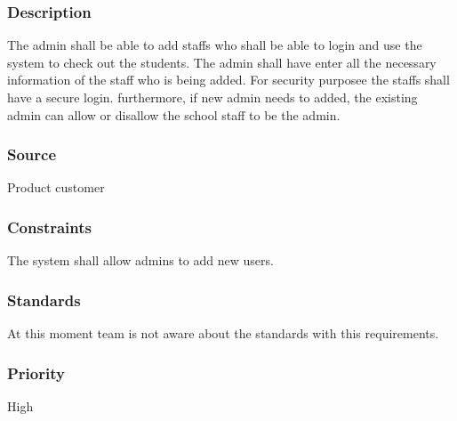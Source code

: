 \subsubsection{Description}
\quad \quad The admin shall be able to add staffs who shall be able to login and use the system to 
check out the students. The admin shall have enter all the necessary information of 
the staff who is being added. For security purposee the staffs shall have a secure 
login. furthermore, if new admin needs to added, the existing admin can allow or 
disallow the school staff to be the admin. 
\subsubsection{Source}
\quad \quad Product customer
\subsubsection{Constraints}
\quad \quad The system shall allow admins to add new users.
\subsubsection{Standards}
\quad \quad At this moment team is not aware about the standards with this requirements.
\subsubsection{Priority}
\quad \quad High

